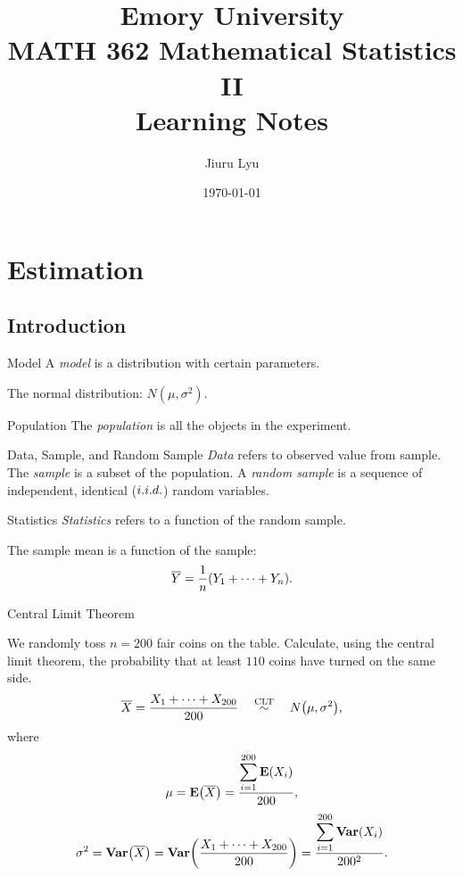 

\title{Emory University\\\textbf{MATH 362 Mathematical Statistics II}\\ Learning Notes}
\author{Jiuru Lyu}
\date{\today}


\maketitle

\tableofcontents

\newpage
\section{Estimation}
\subsection{Introduction}
\begin{df}{Model}
	A \textit{model} is a distribution with certain parameters.	
\end{df}
\begin{eg}
	The normal distribution: $N(\mu,\sigma^2)$.	
\end{eg}
\begin{df}{Population}
	The \textit{population}	is all the objects in the experiment.
\end{df}
\begin{df}{Data, Sample, and Random Sample}
	\textit{Data} refers to observed value from sample. The \textit{sample}	is a subset of the population. A \textit{random sample} is a sequence of independent, identical ($i.i.d.$) random variables.
\end{df}
\begin{df}{Statistics}
	\textit{Statistics} refers to a function of the random sample.
\end{df}
\begin{eg}
	The sample mean is a function of the sample: \[\overline{Y}=\dfrac{1}{n}\qty(Y_1+\cdots+Y_n).\]	
\end{eg}
\begin{eg} 
	Central Limit Theorem\par 
	We randomly toss $n=200$ fair coins on the table. Calculate, using the central limit theorem, the probability that at least $110$ coins have turned on the same side. 
	\[\overline{X}=\dfrac{X_1+\cdots+X_{200}}{200}\quad\stackrel{\text{CLT}}{\sim}\quad N\qty(\mu,\sigma^2),\] where \[\mu=\vb{E}\qty(\overline{X})=\dfrac{\displaystyle\sum_{i=1}^{200}\vb{E}\qty(X_i)}{200},\] \[\sigma^2=\vb{Var}\qty(\overline{X})=\vb{Var}\qty(\dfrac{X_1+\cdots+X_{200}}{200})=\dfrac{\displaystyle\sum_{i=1}^{200}\vb{Var}\qty(X_i)}{200^2}.\]
\end{eg}
